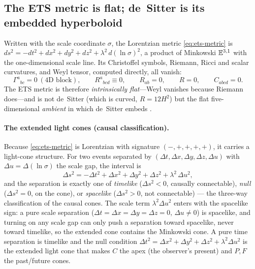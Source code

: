 \subsection{The ETS metric is flat; de~Sitter is its embedded hyperboloid}\label{app:embedding}
Written with the scale coordinate $\sigma$, the Lorentzian metric \eqref{eq:ets-metric} is
$ds^2=-dt^2+dx^2+dy^2+dz^2+\lambda^2\,d(\ln\sigma)^2$, a product of Minkowski $\mathbb{E}^{3,1}$ with the
one-dimensional scale line. Its Christoffel symbols, Riemann, Ricci and scalar curvatures, and Weyl
tensor, computed directly, all vanish:
\[
  \Gamma^a{}_{bc}=0\ (\text{4D block}),\qquad R^a{}_{bcd}\equiv 0,\qquad R_{ab}=0,\qquad R=0,\qquad C_{abcd}=0 .
\]
The ETS metric is therefore \emph{intrinsically flat}---Weyl vanishes because Riemann does---and is
not de~Sitter (which is curved, $R=12H^2$) but the flat five-dimensional \emph{ambient} in which
de~Sitter embeds .

\paragraph{The extended light cones (causal classification).} Because \eqref{eq:ets-metric}
is Lorentzian with signature $(-,+,+,+,+)$, it carries a light-cone structure. For two events
separated by $(\Delta t,\Delta x,\Delta y,\Delta z,\Delta u)$ with $\Delta u=\Delta(\ln\sigma)$
the scale gap, the interval is
\[
  \Delta s^2=-\Delta t^2+\Delta x^2+\Delta y^2+\Delta z^2+\lambda^2\,\Delta u^2 ,
\]
and the separation is exactly one of \emph{timelike} ($\Delta s^2<0$, causally connectable),
\emph{null} ($\Delta s^2=0$, on the cone), or \emph{spacelike} ($\Delta s^2>0$, not connectable)
--- the three-way classification of the causal cones. The scale term $\lambda^2\Delta u^2$ enters
with the spacelike sign: a pure scale separation ($\Delta t=\Delta x=\Delta y=\Delta z=0$,
$\Delta u\neq0$) is spacelike, and turning on any scale gap can only push a separation toward
spacelike, never toward timelike, so the extended cone contains the Minkowski cone. A pure time
separation is timelike and the null condition $\Delta t^2=\Delta x^2+\Delta y^2+\Delta z^2+
\lambda^2\Delta u^2$ is the extended light cone that makes $C$ the apex (the observer's present)
and $P,F$ the past/future cones.

